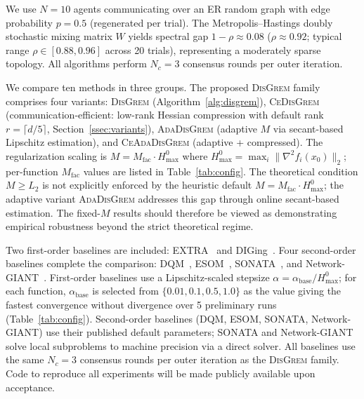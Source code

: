 \documentclass[review,onefignum,onetabnum]{siamart171218}
\begin{document}
	We use $N{=}10$ agents communicating over an ER random graph
	with edge probability $p{=}0.5$ (regenerated per trial).
	The Metropolis--Hastings doubly stochastic mixing matrix $W$ yields
	spectral gap $1{-}\rho\approx 0.08$
	($\rho\approx 0.92$; typical range $\rho\in[0.88,0.96]$ across 20 trials),
	representing a moderately sparse topology.
	All algorithms perform $N_c{=}3$ consensus rounds per outer iteration.
	
	We compare ten methods in three groups.
	The proposed \textsc{DisGrem} family comprises four variants:
	\textsc{DisGrem} (Algorithm~\ref{alg:disgrem}),
	\textsc{CeDisGrem} (communication-efficient: low-rank Hessian compression
	with default rank $r{=}\lceil d/5\rceil$, Section~\ref{ssec:variants}),
	\textsc{AdaDisGrem} (adaptive $M$ via secant-based Lipschitz estimation),
	and \textsc{CeAdaDisGrem} (adaptive + compressed).
	The regularization scaling is $M = M_{\mathrm{fac}}\cdot H_{\max}^{0}$ where
	$H_{\max}^{0} = \max_i \|\nabla^2 f_i(x_0)\|_2$;
	per-function $M_{\mathrm{fac}}$ values are listed in Table~\ref{tab:config}.
	The theoretical condition $M\ge L_2$ is not explicitly
	enforced by the heuristic default $M=M_{\mathrm{fac}}\cdot H_{\max}^0$;
	the adaptive variant \textsc{AdaDisGrem} addresses this gap through
	online secant-based estimation.
	The fixed-$M$ results should therefore be viewed as demonstrating
	empirical robustness beyond the strict theoretical regime.
	
	Two first-order baselines are included:
	EXTRA~\citep{shi2015extra} and
	DIGing~\citep{nedic2017diging}.
	Four second-order baselines complete the comparison:
	DQM~\citep{eisen2017dqn},
	ESOM~\citep{mokhtari2016esom},
	SONATA~\citep{sun2022sonata}, and
	Network-GIANT~\citep{ye2023networkgiant}.
	First-order baselines use a Lipschitz-scaled stepsize
	$\alpha=\alpha_{\mathrm{base}}/H_{\max}^{0}$;
	for each function, $\alpha_{\mathrm{base}}$ is selected from
	$\{0.01, 0.1, 0.5, 1.0\}$ as the value giving the fastest
	convergence without divergence over 5 preliminary runs
	(Table~\ref{tab:config}).
	Second-order baselines (DQM, ESOM, SONATA, Network-GIANT) use their
	published default parameters; SONATA and Network-GIANT solve local
	subproblems to machine precision via a direct solver.
	All baselines use the same $N_c{=}3$ consensus rounds per outer
	iteration as the \textsc{DisGrem} family.
	Code to reproduce all experiments will be made publicly available
	upon acceptance.
	
\end{document}
